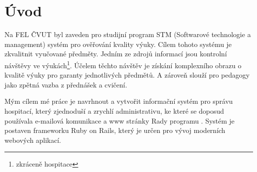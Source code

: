 \chapter{Úvod}

Na FEL ČVUT byl zaveden pro studijní program STM (Softwarové technologie a management) systém pro ověřování kvality výuky. Cílem tohoto systému je zkvalitnit vyučované předměty. Jedním ze zdrojů informací jsou kontrolní návštěvy ve výukách\footnote{zkráceně hospitace}. Účelem těchto návštěv je získání komplexního obrazu o kvalitě výuky pro garanty jednotlivých předmětů. A zároveň slouží pro pedagogy jako zpětná vazba z přednášek a cvičení.

Mým cílem mé práce je navrhnout a vytvořit informační systém pro správu hospitací, který zjednoduší a zrychlí administrativu, ke které se doposud používala e-mailová komunikace a www stránky Rady programu \cite{kvalitavyukyweb}. Systém je postaven frameworku Ruby on Rails, který je určen pro vývoj moderních webových aplikací.

